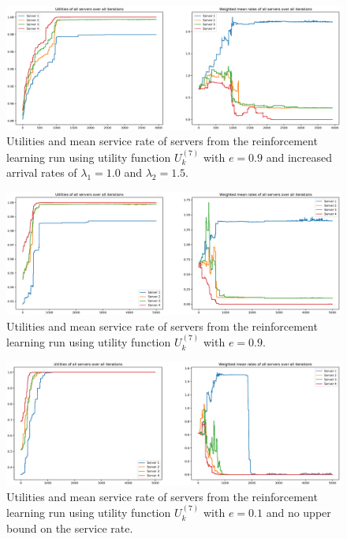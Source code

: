 \begin{figure}[H]
    \includegraphics[width=\textwidth]{chapters/00_appendix/03_more_rl_results/Bin/utility_7_eps/u7_4_e09_Lambda_25.eps}
    \caption{Utilities and mean service rate of servers from the reinforcement
    learning run using utility function \(U_k^{(7)}\) with \(e = 0.9\) and
    increased arrival rates of \(\lambda_1 = 1.0\) and \(\lambda_2 = 1.5\).}
    \label{fig:RL_utility7_4_e09_Lambda_25}
\end{figure}

\begin{figure}[H]
    \includegraphics[width=\textwidth]{chapters/00_appendix/03_more_rl_results/Bin/utility_7_eps/u7_4_e09.eps}
    \caption{Utilities and mean service rate of servers from the reinforcement
    learning run using utility function \(U_k^{(7)}\) with \(e = 0.9\).}
    \label{fig:RL_utility7_4_e09}
\end{figure}


\begin{figure}[H]
    \includegraphics[width=\textwidth]{chapters/00_appendix/03_more_rl_results/Bin/utility_7_eps/u7_5_no_max_e01.eps}
    \caption{Utilities and mean service rate of servers from the reinforcement
    learning run using utility function \(U_k^{(7)}\) with \(e = 0.1\) and no
    upper bound on the service rate.}
    \label{fig:RL_utility7_5_no_max_e01}
\end{figure}

